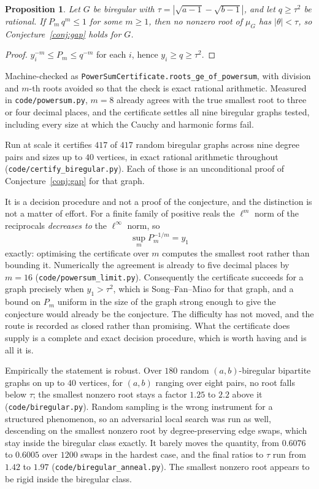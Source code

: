 \documentclass[11pt]{article}
\newtheorem{proposition}[theorem]{Proposition}
\theoremstyle{remark}
\begin{document}
\begin{proposition}\label{prop:powersum}
Let $G$ be biregular with $\tau=|\sqrt{a-1}-\sqrt{b-1}|$, and let $q\ge\tau^2$ be rational.
If $P_m\,q^m\le1$ for some $m\ge1$, then no nonzero root of $\mu_G$ has $|\theta|<\tau$, so
Conjecture~\ref{conj:gap} holds for $G$.
\end{proposition}

\begin{proof}
$y_i^{-m}\le P_m\le q^{-m}$ for each $i$, hence $y_i\ge q\ge\tau^2$.
\end{proof}

Machine-checked as \texttt{PowerSumCertificate.roots\_ge\_of\_powersum}, with division and
$m$-th roots avoided so that the check is exact rational arithmetic. Measured in
\texttt{code/powersum.py}, $m=8$ already agrees with the true smallest root to three or four
decimal places, and the certificate settles all nine biregular graphs tested, including every
size at which the Cauchy and harmonic forms fail.

Run at scale it certifies $417$ of $417$ random biregular graphs across nine degree pairs and
sizes up to $40$ vertices, in exact rational arithmetic throughout
(\texttt{code/certify\_biregular.py}). Each of those is an unconditional proof of
Conjecture~\ref{conj:gap} for that graph.

It is a decision procedure and not a proof of the conjecture, and the distinction is not a
matter of effort. For a finite family of positive reals the $\ell^m$ norm of the reciprocals
\emph{decreases to} the $\ell^\infty$ norm, so
\[
   \sup_m P_m^{-1/m}=y_1
\]
exactly: optimising the certificate over $m$ computes the smallest root rather than bounding
it. Numerically the agreement is already to five decimal places by $m=16$
(\texttt{code/powersum\_limit.py}). Consequently the certificate succeeds for a graph
precisely when $y_1>\tau^2$, which is Song--Fan--Miao for that graph, and a bound on $P_m$
uniform in the size of the graph strong enough to give the conjecture would already be the
conjecture. The difficulty has not moved, and the route is recorded as closed rather than
promising. What the certificate does supply is a complete and exact decision procedure, which
is worth having and is all it is.

Empirically the statement is robust. Over $180$ random $(a,b)$-biregular bipartite graphs on
up to $40$ vertices, for $(a,b)$ ranging over eight pairs, no root falls below $\tau$; the
smallest nonzero root stays a factor $1.25$ to $2.2$ above it
(\texttt{code/biregular.py}). Random sampling is the wrong instrument for a structured
phenomenon, so an adversarial local search was run as well, descending on the smallest nonzero
root by degree-preserving edge swaps, which stay inside the biregular class exactly. It barely
moves the quantity, from $0.6076$ to $0.6005$ over $1200$ swaps in the hardest case, and the
final ratios to $\tau$ run from $1.42$ to $1.97$ (\texttt{code/biregular\_anneal.py}). The
smallest nonzero root appears to be rigid inside the biregular class.
\end{document}
